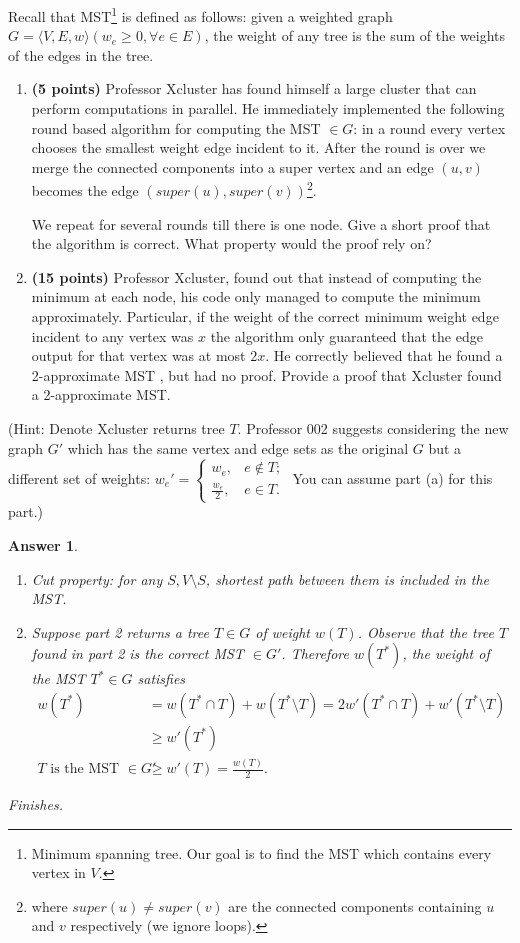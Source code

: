 \documentclass[11pt]{article}
\theoremstyle{numberplain}
\theoremstyle{nonumberplain}
\newtheorem{ans}{Answer}
\newcommand{\0}{{\mathbf{0}}}
\begin{document}
\begin{ques} Recall that MST\footnote{Minimum spanning tree. Our goal is to find the MST which contains every vertex in $V$.} is defined as follows:
given a weighted graph $G = \langle V,E,w \rangle (w_e\geq 0,\forall e\in E)$, the weight of any tree is the sum of the weights of the edges
in the tree. 
\begin{enumerate}
\item \textbf{(5 points)} Professor Xcluster has found himself a large cluster that can perform computations
in parallel. He immediately implemented the following round based algorithm for computing
the MST $\in G$: in a round every vertex
chooses the smallest weight edge incident to it. After the round is over we merge the connected
components into a super vertex and an edge $(u, v)$ becomes the edge $(super(u), super(v))$\footnote{where $super(u) \neq  super(v)$ are the connected components containing $u$ and $v$ respectively
(we ignore loops).}.

 We repeat for several rounds till there is one node. Give a short proof
that the algorithm is correct. What property would the proof rely on?
\item \textbf{(15 points)} Professor Xcluster, found out that instead of computing the minimum at each node, his code only managed to compute the minimum approximately. Particular, if the weight of the correct minimum weight edge incident to any vertex was $x$ the algorithm only guaranteed
that the edge output for that vertex was at most $2x$.
He correctly believed that he found a 2-approximate MST
, but had no proof. Provide a proof that Xcluster found a 2-approximate MST.
\end{enumerate}

(Hint: Denote Xcluster returns tree $T$. Professor 002 suggests considering the new graph $G'$ which has the same vertex and
edge sets as the original $G$ but a different set of weights: $w_e'=\left\{ \begin{array}{rl}
w_e, & e\notin T; \\ \frac{w_e}{2}, & e\in T.
\end{array} \right.
$
 You can assume part (a) for this part.)
\end{ques}

\begin{ans}
\begin{enumerate}
\item  Cut property: for any $S, V\setminus S$, shortest path between them is included in the MST.
\item Suppose part 2 returns a tree $T\in G$ of weight $w(T)$. Observe that the tree $T$ found in part 2 is the correct MST $\in G'$. Therefore  $w(T^*)$, the weight of the MST $T^*\in G$ satisfies 
\begin{eqnarray*}
w(T^*)&&=w(T^*\cap T)+w(T^*\setminus T)= 2 w'(T^*\cap T)+w'(T^*\setminus T) \\
 &&\geq w'(T^*) \\
T \text{ is the MST }\in G' && \geq w'(T)=\frac{w(T)}{2}.
\end{eqnarray*}
\end{enumerate}
Finishes.
\end{ans}
\end{document}
